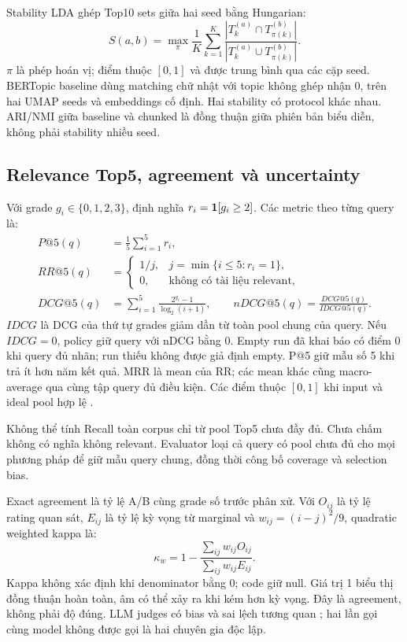 Stability LDA ghép Top10 sets giữa hai seed bằng Hungarian:
\begin{equation}\label{eq:stability}
S(a,b)=\max_{\pi}\frac1K\sum_{k=1}^{K}
\frac{|T_k^{(a)}\cap T_{\pi(k)}^{(b)}|}{|T_k^{(a)}\cup T_{\pi(k)}^{(b)}|}.
\end{equation}
$\pi$ là phép hoán vị; điểm thuộc $[0,1]$ và được trung bình qua các cặp seed. BERTopic baseline dùng matching chữ nhật với topic không ghép nhận 0, trên hai UMAP seeds và embeddings cố định. Hai stability có protocol khác nhau. ARI/NMI giữa baseline và chunked là đồng thuận giữa phiên bản biểu diễn, không phải stability nhiều seed.

\subsection{Relevance Top5, agreement và uncertainty}
Với grade $g_i\in\{0,1,2,3\}$, định nghĩa $r_i=\mathbf{1}[g_i\ge2]$. Các metric theo từng query là:
\begin{align}
P@5(q)&=\frac15\sum_{i=1}^{5}r_i,\label{eq:p5}\\
RR@5(q)&=\begin{cases}1/j,&j=\min\{i\le5:r_i=1\},\\0,&\text{không có tài liệu relevant,}\end{cases}\label{eq:rr}\\
DCG@5(q)&=\sum_{i=1}^{5}\frac{2^{g_i}-1}{\log_2(i+1)},\qquad
nDCG@5(q)=\frac{DCG@5(q)}{IDCG@5(q)}.\label{eq:ndcg}
\end{align}
$IDCG$ là DCG của thứ tự grades giảm dần từ toàn pool chung của query. Nếu $IDCG=0$, policy giữ query với nDCG bằng 0. Empty run đã khai báo có điểm 0 khi query đủ nhãn; run thiếu không được giả định empty. P@5 giữ mẫu số 5 khi trả ít hơn năm kết quả. MRR là mean của RR; các mean khác cũng macro-average qua cùng tập query đủ điều kiện. Các điểm thuộc $[0,1]$ khi input và ideal pool hợp lệ \cite{irbook}.

Không thể tính Recall toàn corpus chỉ từ pool Top5 chưa đầy đủ. Chưa chấm không có nghĩa không relevant. Evaluator loại cả query có pool chưa đủ cho mọi phương pháp để giữ mẫu query chung, đồng thời công bố coverage và selection bias.

Exact agreement là tỷ lệ A/B cùng grade số trước phân xử. Với $O_{ij}$ là tỷ lệ rating quan sát, $E_{ij}$ là tỷ lệ kỳ vọng từ marginal và $w_{ij}=(i-j)^2/9$, quadratic weighted kappa là:
\begin{equation}\label{eq:kappa}
\kappa_w=1-\frac{\sum_{ij}w_{ij}O_{ij}}{\sum_{ij}w_{ij}E_{ij}}.
\end{equation}
Kappa không xác định khi denominator bằng 0; code giữ null. Giá trị 1 biểu thị đồng thuận hoàn toàn, âm có thể xảy ra khi kém hơn kỳ vọng. Đây là agreement, không phải độ đúng. LLM judges có bias và sai lệch tương quan \cite{llmjudge}; hai lần gọi cùng model không được gọi là hai chuyên gia độc lập.

